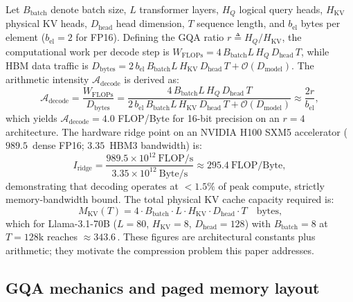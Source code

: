 \documentclass[final,5p,times,twocolumn]{elsarticle}
\theoremstyle{definition}
\theoremstyle{remark}
\newcommand{\HQ}{H_{Q}}
\newcommand{\HKV}{H_{\mathrm{KV}}}
\newcommand{\Dmodel}{D_{\mathrm{model}}}
\newcommand{\Dhead}{D_{\mathrm{head}}}
\newcommand{\Bbatch}{B_{\mathrm{batch}}}
\newcommand{\GB}{\,\text{GB}}
\newcommand{\TBs}{\,\text{TB/s}}
\newcommand{\TFLOPs}{\,\text{TFLOP/s}}
\begin{document}
Let $\Bbatch$ denote batch size, $L$ transformer layers, $\HQ$ logical
query heads, $\HKV$ physical KV heads, $\Dhead$ head dimension, $T$ sequence length, and $b_{\mathrm{el}}$ bytes per element
($b_{\mathrm{el}}=2$ for FP16). Defining the GQA ratio
 $r \triangleq \HQ/\HKV$, the computational work per decode step is
 $W_{\mathrm{FLOPs}} = 4\,\Bbatch L\,\HQ\,\Dhead\,T$, while HBM data
traffic is
 $D_{\mathrm{bytes}} = 2\,b_{\mathrm{el}}\,\Bbatch L\,\HKV\,\Dhead\,T
+ \mathcal{O}(\Dmodel)$. The arithmetic intensity
 $\mathcal{A}_{\mathrm{decode}}$ is derived as:
\begin{equation}
\mathcal{A}_{\mathrm{decode}}
= \frac{W_{\mathrm{FLOPs}}}{D_{\mathrm{bytes}}}
= \frac{4\,\Bbatch L\,\HQ\,\Dhead\,T}
       {2\,b_{\mathrm{el}}\,\Bbatch L\,\HKV\,\Dhead\,T
        + \mathcal{O}(\Dmodel)}
\approx \frac{2r}{b_{\mathrm{el}}},
\label{eq:arithmetic_intensity}
\end{equation}
which yields $\mathcal{A}_{\mathrm{decode}} = 4.0$ FLOP/Byte for 16-bit
precision on an $r = 4$ architecture. The hardware ridge point on an
NVIDIA H100 SXM5 accelerator ($989.5$\TFLOPs{} dense FP16;
 $3.35$\TBs{} HBM3 bandwidth) is:
\begin{equation}
I_{\mathrm{ridge}}
= \frac{989.5 \times 10^{12}\ \text{FLOP/s}}
       {3.35 \times 10^{12}\ \text{Byte/s}}
\approx 295.4\ \text{FLOP/Byte},
\label{eq:ridge_point}
\end{equation}
demonstrating that decoding operates at $< 1.5\%$ of peak compute,
strictly memory-bandwidth bound. The total physical KV cache capacity
required is:
\begin{equation}
M_{\mathrm{KV}}(T)
= 4 \cdot \Bbatch \cdot L \cdot \HKV \cdot \Dhead \cdot T
\quad \text{bytes,}
\label{eq:kv_footprint}
\end{equation}
which for Llama-3.1-70B ($L{=}80$, $\HKV{=}8$, $\Dhead{=}128$) with
 $\Bbatch{=}8$ at $T{=}128\text{k}$ reaches $\approx 343.6$\GB. These
figures are architectural constants plus arithmetic; they motivate the
compression problem this paper addresses.

\subsection{GQA mechanics and paged memory layout}
\label{subsec:gqa}
\end{document}
